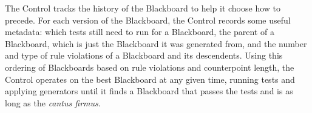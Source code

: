 The Control tracks the history of the Blackboard to help it choose how to precede.
For each version of the Blackboard, the Control records some useful metadata:
  which tests still need to run for a Blackboard,
  the parent of a Blackboard, which is just the Blackboard it was generated from,
  and the number and type of rule violations of a Blackboard and its descendents.
Using this ordering of Blackboards based on rule violations and counterpoint length, 
  the Control operates on the best Blackboard at any given time, 
  running tests and applying generators until it finds a Blackboard that passes the tests and is as long as the \emph{cantus firmus}.

